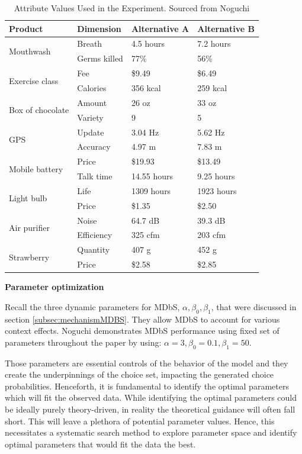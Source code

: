 \documentclass[a4paper,12pt]{article}
\newcommand{\citeyearonly}[1]{\citeyearpar{#1}}
\begin{document}
\begin{table}
\centering

\begin{tabular}{l|lll}
\hline
Product & Dimension & Alternative A & Alternative B \\
\hline
\multirow{2}{*}{Mouthwash} & Breath & 4.5 hours & 7.2 hours \\
 & Germs killed & 77\% & 56\% \\[2ex]
\multirow{2}{*}{Exercise class} & Fee & \$9.49 & \$6.49 \\
 & Calories & 356 kcal & 259 kcal \\[2ex]
\multirow{2}{*}{Box of chocolate} & Amount & 26 oz & 33 oz \\
 & Variety & 9 & 5 \\[2ex]
\multirow{2}{*}{GPS} & Update & 3.04 Hz & 5.62 Hz \\
 & Accuracy & 4.97 m & 7.83 m \\[2ex]
\multirow{2}{*}{Mobile battery} & Price & \$19.93 & \$13.49 \\
 & Talk time & 14.55 hours & 9.25 hours \\[2ex]
\multirow{2}{*}{Light bulb} & Life & 1309 hours & 1923 hours \\
 & Price & \$1.35 & \$2.50 \\[2ex]
\multirow{2}{*}{Air purifier} & Noise & 64.7 dB & 39.3 dB \\
 & Efficiency & 325 cfm & 203 cfm \\[2ex]
\multirow{2}{*}{Strawberry} & Quantity & 407 g & 452 g \\
 & Price & \$2.58 & \$2.85 \\
\hline
\end{tabular}
\caption{Attribute Values Used in the Experiment. Sourced from Noguchi \citeyearonly{noguchi2018multialternative}}
\label{tab:noguchiDescriptions}
\end{table}

\textbf{Parameter optimization}

Recall the three dynamic parameters for MDbS, $\alpha, \beta_0, \beta_1$, that were discussed in section \ref{subsec:mechanismMDBS}. They allow MDbS to account for various context effects. Noguchi \citeyearonly{noguchi2018multialternative} demonstrates MDbS performance using fixed set of parameters throughout the paper by using: $\alpha = 3, \beta_0 = 0.1, \beta_1 = 50$. 

Those parameters are essential controls of the behavior of the model and they create the underpinnings of the choice set, impacting the generated choice probabilities. Henceforth, it is fundamental to identify the optimal parameters which will fit the observed data. While identifying the optimal parameters could be ideally purely theory-driven, in reality the theoretical guidance will often fall short. This will leave a plethora of potential parameter values. Hence, this necessitates a systematic search method to explore parameter space and identify optimal parameters that would fit the data the best.
\end{document}
